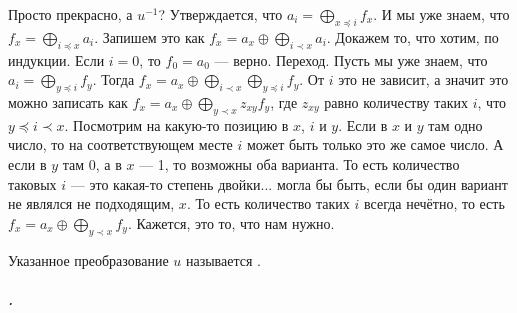 \documentclass{article}
\begin{document}
\begin{itemize}
\begin{Comment}
            Просто прекрасно, а $u^{-1}$? Утверждается, что $a_i=\bigoplus\limits_{x\preccurlyeq i}f_x$. И мы уже знаем, что $f_x=\bigoplus\limits_{i\preccurlyeq x}a_i$. Запишем это как $f_x=a_x\oplus\bigoplus\limits_{i\prec x}a_i$. Докажем то, что хотим, по индукции. Если $i=0$, то $f_0=a_0$ --- верно. Переход. Пусть мы уже знаем, что $a_i=\bigoplus\limits_{y\preccurlyeq i}f_y$. Тогда $f_x=a_x\oplus\bigoplus\limits_{i\prec x}\bigoplus\limits_{y\preccurlyeq i}f_y$. От $i$ это не зависит, а значит это можно записать как $f_x=a_x\oplus\bigoplus\limits_{y\prec x}z_{xy}f_y$, где $z_{xy}$ равно количеству таких $i$, что $y\preccurlyeq i\prec x$. Посмотрим на какую-то позицию в $x$, $i$ и $y$. Если в $x$ и $y$ там одно число, то на соответствующем месте $i$ может быть только это же самое число. А если в $y$ там 0, а в $x$ --- 1, то возможны оба варианта. То есть количество таковых $i$ --- это какая-то степень двойки... могла бы быть, если бы один вариант не являлся не подходящим, $x$. То есть количество таких $i$ всегда нечётно, то есть $f_x=a_x\oplus\bigoplus\limits_{y\prec x}f_y$. Кажется, это то, что нам нужно.\\
        \end{Comment}
        \dfn Указанное преобразование $u$ называется .
    \end{itemize}
    \subparagraph{.}
\end{document}
